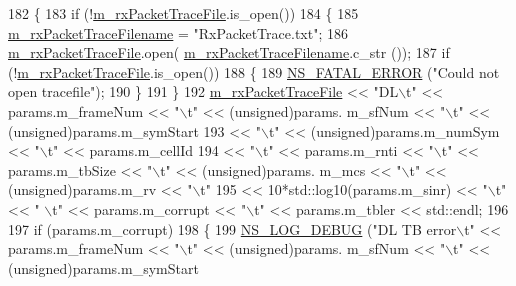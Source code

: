 \begin{DoxyCode}
182 \{
183         \textcolor{keywordflow}{if} (!\hyperlink{classns3_1_1MmWavePhyRxTrace_a07034985924a2a3d7f94264c374d89b0}{m\_rxPacketTraceFile}.is\_open())
184         \{
185                 \hyperlink{classns3_1_1MmWavePhyRxTrace_a77b3807d28e4e1e7422c2e15da797ee5}{m\_rxPacketTraceFilename} = \textcolor{stringliteral}{"RxPacketTrace.txt"};
186                 \hyperlink{classns3_1_1MmWavePhyRxTrace_a07034985924a2a3d7f94264c374d89b0}{m\_rxPacketTraceFile}.open(
      \hyperlink{classns3_1_1MmWavePhyRxTrace_a77b3807d28e4e1e7422c2e15da797ee5}{m\_rxPacketTraceFilename}.c\_str ());
187                 \textcolor{keywordflow}{if} (!\hyperlink{classns3_1_1MmWavePhyRxTrace_a07034985924a2a3d7f94264c374d89b0}{m\_rxPacketTraceFile}.is\_open())
188                 \{
189                         \hyperlink{group__fatal_ga5131d5e3f75d7d4cbfd706ac456fdc85}{NS\_FATAL\_ERROR} (\textcolor{stringliteral}{"Could not open tracefile"});
190                 \}
191         \}
192         \hyperlink{classns3_1_1MmWavePhyRxTrace_a07034985924a2a3d7f94264c374d89b0}{m\_rxPacketTraceFile} << \textcolor{stringliteral}{"DL\(\backslash\)t"} << params.m\_frameNum << \textcolor{stringliteral}{"\(\backslash\)t"} << (unsigned)params.
      m\_sfNum << \textcolor{stringliteral}{"\(\backslash\)t"} << (\textcolor{keywordtype}{unsigned})params.m\_symStart
193                         << \textcolor{stringliteral}{"\(\backslash\)t"} << (unsigned)params.m\_numSym << \textcolor{stringliteral}{"\(\backslash\)t"} << params.m\_cellId
194                         << \textcolor{stringliteral}{"\(\backslash\)t"} << params.m\_rnti << \textcolor{stringliteral}{"\(\backslash\)t"} << params.m\_tbSize << \textcolor{stringliteral}{"\(\backslash\)t"} << (\textcolor{keywordtype}{unsigned})params.
      m\_mcs << \textcolor{stringliteral}{"\(\backslash\)t"} << (unsigned)params.m\_rv << \textcolor{stringliteral}{"\(\backslash\)t"}
195                         << 10*std::log10(params.m\_sinr) << \textcolor{stringliteral}{"\(\backslash\)t"} << \textcolor{stringliteral}{" \(\backslash\)t"} << params.m\_corrupt << \textcolor{stringliteral}{"\(\backslash\)t"} <<  
      params.m\_tbler << std::endl;
196 
197         \textcolor{keywordflow}{if} (params.m\_corrupt)
198         \{
199                 \hyperlink{group__logging_ga413f1886406d49f59a6a0a89b77b4d0a}{NS\_LOG\_DEBUG} (\textcolor{stringliteral}{"DL TB error\(\backslash\)t"} << params.m\_frameNum << \textcolor{stringliteral}{"\(\backslash\)t"} << (\textcolor{keywordtype}{unsigned})params.
      m\_sfNum << \textcolor{stringliteral}{"\(\backslash\)t"} << (\textcolor{keywordtype}{unsigned})params.m\_symStart

\end{DoxyCode}
